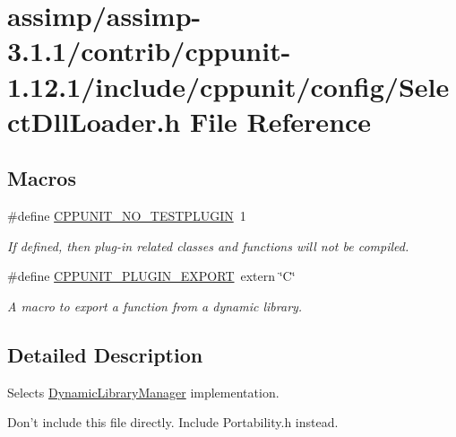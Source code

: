 \hypertarget{assimp_2assimp-3_81_81_2contrib_2cppunit-1_812_81_2include_2cppunit_2config_2_select_dll_loader_8h}{\section{assimp/assimp-\/3.1.1/contrib/cppunit-\/1.12.1/include/cppunit/config/\+Select\+Dll\+Loader.h File Reference}
\label{assimp_2assimp-3_81_81_2contrib_2cppunit-1_812_81_2include_2cppunit_2config_2_select_dll_loader_8h}
}
\subsection*{Macros}
\begin{DoxyCompactItemize}
\item 
\hypertarget{assimp_2assimp-3_81_81_2contrib_2cppunit-1_812_81_2include_2cppunit_2config_2_select_dll_loader_8h_a55b6e7232bf4c15eca3cd64753c17272}{\#define \hyperlink{assimp_2assimp-3_81_81_2contrib_2cppunit-1_812_81_2include_2cppunit_2config_2_select_dll_loader_8h_a55b6e7232bf4c15eca3cd64753c17272}{C\+P\+P\+U\+N\+I\+T\+\_\+\+N\+O\+\_\+\+T\+E\+S\+T\+P\+L\+U\+G\+I\+N}~1}\label{assimp_2assimp-3_81_81_2contrib_2cppunit-1_812_81_2include_2cppunit_2config_2_select_dll_loader_8h_a55b6e7232bf4c15eca3cd64753c17272}

\begin{DoxyCompactList}\small\item\em If defined, then plug-\/in related classes and functions will not be compiled. \end{DoxyCompactList}\item 
\#define \hyperlink{group___writing_test_plug_in_ga477408f06c41af1d46b8f17f21b3b5d6}{C\+P\+P\+U\+N\+I\+T\+\_\+\+P\+L\+U\+G\+I\+N\+\_\+\+E\+X\+P\+O\+R\+T}~extern \char`\"{}C\char`\"{}
\begin{DoxyCompactList}\small\item\em A macro to export a function from a dynamic library. \end{DoxyCompactList}\end{DoxyCompactItemize}


\subsection{Detailed Description}
Selects \hyperlink{class_dynamic_library_manager}{Dynamic\+Library\+Manager} implementation.

Don't include this file directly. Include Portability.\+h instead. 